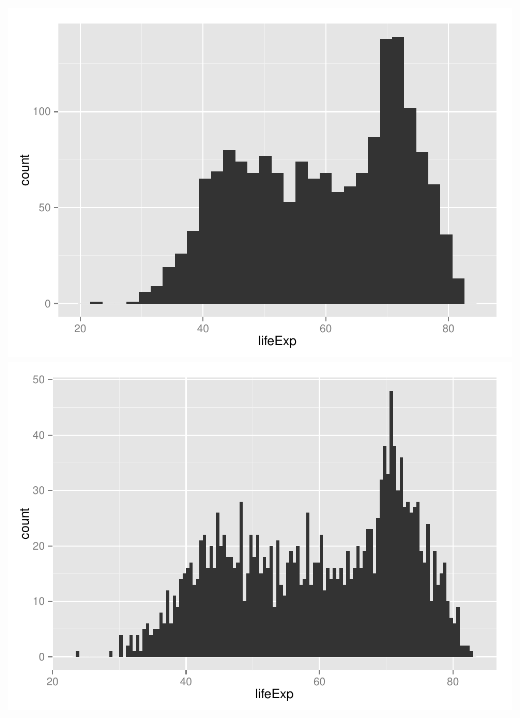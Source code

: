 \documentclass[]{article}
\begin{document}
\includegraphics{GapMinder_rMarkdown_files/figure-latex/unnamed-chunk-41.pdf}
\includegraphics{GapMinder_rMarkdown_files/figure-latex/unnamed-chunk-42.pdf}
\end{document}
